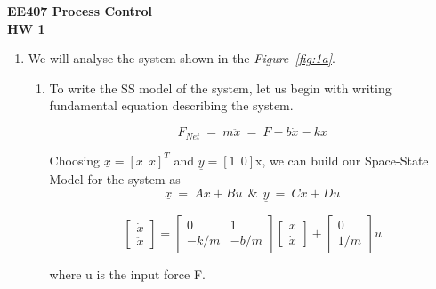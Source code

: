 \documentclass[a4paper,12pt]{article}
\begin{document}
\begin{center}
	\textbf{\large EE407 Process Control \\[0.2cm] HW 1} \\
\end{center}

\begin{enumerate}
	\item We will analyse the system shown in the \textit{Figure~\ref{fig:1a}}. 

		\begin{enumerate}
			\item To write the SS model of the system, let us begin with writing fundamental equation describing the system.
			
			$$	F_{Net}~=~m\ddot{x}~=~F-b\dot{x}-kx	$$
			
			Choosing $\underline{x} = {[x~~\dot{x}]}^T$ and $ \underline{y} = [1~~0] $x, we can build our Space-State Model for the system as 
			$$  \underline{\dot{x}}~=~Ax+Bu  ~~ \& ~~  \underline{y}~=~Cx+Du			$$
			
			\[
			\begin{bmatrix}
   				\dot{x} \\
   			 	\ddot{x}
			\end{bmatrix}
			=
			\begin{bmatrix}
    			0 & 1 \\
    			-k/m & -b/m
			\end{bmatrix}			
			\begin{bmatrix}
   				x \\
   			 	\dot{x}
			\end{bmatrix}
			+
			\begin{bmatrix}
   				0 \\
   			 	1/m
			\end{bmatrix}
			u
			\]
			
			where u is the input force F.
			

\end{enumerate}
\end{enumerate}
\end{document}
